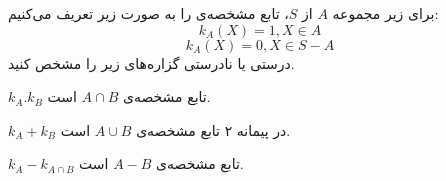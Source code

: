  برای زیر مجموعه $A$ از $S$، تابع مشخصه‌ی  را به صورت زیر تعریف می‌کنیم:
\[
k_A(X) = 1 , X \in A
\]
\[
k_A(X) = 0, X \in S-A
\]
درستی یا نادرستی گزاره‌های زیر را مشخص کنید.


 $k_A.k_B$ تابع مشخصه‌ی $A \cap B$ است.

 $k_A + k_B$ در پیمانه ۲ تابع مشخصه‌ی $A \cup B$ است.

 $k_A - k_{A\cap B}$ تابع مشخصه‌ی $A-B$ است.

